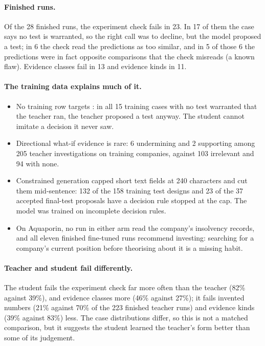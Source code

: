 \paragraph{Finished runs.} Of the 28 finished runs, the experiment check fails in 23. In 17 of them the case says no test
is warranted, so the right call was to decline, but the model proposed a test; in 6 the check read the predictions as
too similar, and in 5 of those 6 the predictions were in fact opposite comparisons that the check misreads (a known
flaw). Evidence classes fail in 13 and evidence kinds in 11.

\paragraph{The training data explains much of it.}
\begin{itemize}
  \item No training row targets : in all 15 training cases with no test warranted that the teacher
        ran, the teacher proposed a test anyway. The student cannot imitate a decision it never saw.
  \item Directional what-if evidence is rare: 6 undermining and 2 supporting among 205 teacher investigations on training
        companies, against 103 irrelevant and 94 with none.
  \item Constrained generation capped short text fields at 240 characters and cut them mid-sentence: 132 of the 158
        training test designs and 23 of the 37 accepted final-test proposals have a decision rule stopped at the cap. The
        model was trained on incomplete decision rules.
  \item On Aquaporin, no run in either arm read the company's insolvency records, and all eleven finished fine-tuned runs
        recommend investing: searching for a company's current position before theorising about it is a missing habit.
\end{itemize}

\paragraph{Teacher and student fail differently.} The student fails the experiment check far more often than the
teacher (82\% against 39\%), and evidence classes more (46\% against 27\%); it fails invented numbers (21\% against 70\% of the 223 finished teacher runs)
and evidence kinds (39\% against 83\%) less. The case distributions differ, so this is not a matched comparison, but it
suggests the student learned the teacher's form better than some of its judgement.

